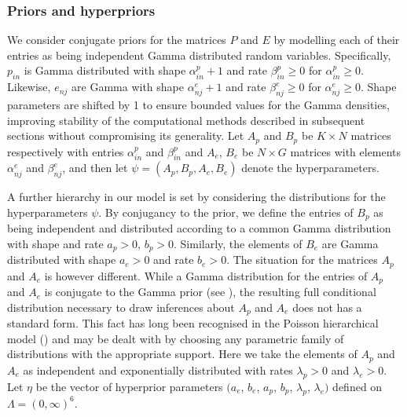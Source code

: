 \documentclass{bioinfo}
\begin{document}
\subsubsection{Priors and hyperpriors} 
We consider conjugate priors for the matrices $P$ and $E$ by modelling
each of their entries as being independent Gamma distributed random
variables. Specifically, $p_{in}$ is Gamma distributed with shape
$\alpha_{in}^p + 1$ and rate $\beta_{in}^p \geqslant 0$ for
$\alpha_{in}^p \geqslant 0$. Likewise, $e_{nj}$ are Gamma with shape
$\alpha_{nj}^e+1$ and rate $\beta_{nj}^e \geqslant 0$ for
$\alpha_{nj}^e \geqslant 0$. Shape parameters are shifted by 1 to
ensure bounded values for the Gamma densities, improving stability of
the computational methods described in subsequent sections without
compromising its generality. Let $A_p$ and $B_p$ be $K\times N$
matrices respectively with entries $\alpha_{in}^p$ and $\beta_{in}^p$
and $A_e$, $B_e$ be $N\times G$ matrices with elements $\alpha_{nj}^e$
and $\beta_{nj}^e$, and then let $\psi = (A_p, B_p, A_e, B_e)$ denote
the hyperparameters.


A further hierarchy in our model is set by considering the
distributions for the hyperparameters $\psi$. By conjugancy to the
prior, we define the entries of $B_p$ as being independent and
distributed according to a common Gamma distribution with shape and
rate $a_p > 0$, $b_p > 0$. Similarly, the elements of $B_e$ are Gamma
distributed with shape $a_e>0$ and rate $b_e>0$. The situation for the
matrices $A_p$ and $A_e$ is however different. While a Gamma
distribution for the entries of $A_p$ and $A_e$ is conjugate to the
Gamma prior (see \citealp{M}), the resulting full conditional
distribution necessary to draw inferences about $A_p$ and
$A_e$ does not has a standard form.  This fact has long been
recognised in the Poisson hierarchical model (\citealp{GMS93}) and may
be dealt with by choosing any parametric family of distributions with
the appropriate support. Here we take the elements of $A_p$ and
$A_e$ as independent and exponentially distributed with rates
$\lambda_p > 0$ and $\lambda_e > 0$.  Let $\eta$ be the vector of
hyperprior parameters $(a_e$, $b_e$, $a_p$, $b_p$, $\lambda_p$,
$\lambda_e)$ defined on $\Lambda = (0, \infty)^6$.
\end{document}
